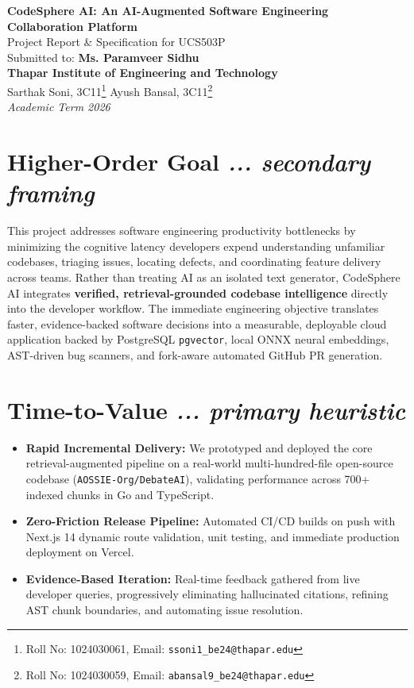 \documentclass[11pt,a4paper]{article}
\begin{document}
\begin{center}
    {\LARGE \textbf{CodeSphere AI: An AI-Augmented Software Engineering Collaboration Platform}}\\[8pt]
    {\large Project Report \& Specification for UCS503P}\\[4pt]
    {\normalsize Submitted to: \textbf{Ms. Paramveer Sidhu}}\\[2pt]
    {\normalsize \textbf{Thapar Institute of Engineering and Technology}}\\[8pt]
    {\normalsize Sarthak Soni, 3C11\footnote{Roll No: 1024030061, Email: \texttt{ssoni1\_be24@thapar.edu}} \quad\quad Ayush Bansal, 3C11\footnote{Roll No: 1024030059, Email: \texttt{abansal9\_be24@thapar.edu}}}\\[6pt]
    {\normalsize \textit{Academic Term 2026}}
\end{center}

\vspace{10pt}

\section{Higher-Order Goal \hfill \normalfont\small\textit{... secondary framing}}
This project addresses software engineering productivity bottlenecks by minimizing the cognitive latency developers expend understanding unfamiliar codebases, triaging issues, locating defects, and coordinating feature delivery across teams. Rather than treating AI as an isolated text generator, CodeSphere AI integrates \textbf{verified, retrieval-grounded codebase intelligence} directly into the developer workflow. The immediate engineering objective translates faster, evidence-backed software decisions into a measurable, deployable cloud application backed by PostgreSQL \texttt{pgvector}, local ONNX neural embeddings, AST-driven bug scanners, and fork-aware automated GitHub PR generation.

\section{Time-to-Value \hfill \normalfont\small\textit{... primary heuristic}}
\begin{itemize}
    \item \textbf{Rapid Incremental Delivery:} We prototyped and deployed the core retrieval-augmented pipeline on a real-world multi-hundred-file open-source codebase (\texttt{AOSSIE-Org/DebateAI}), validating performance across 700+ indexed chunks in Go and TypeScript.
    \item \textbf{Zero-Friction Release Pipeline:} Automated CI/CD builds on push with Next.js 14 dynamic route validation, unit testing, and immediate production deployment on Vercel.
    \item \textbf{Evidence-Based Iteration:} Real-time feedback gathered from live developer queries, progressively eliminating hallucinated citations, refining AST chunk boundaries, and automating issue resolution.
\end{itemize}
\end{document}
